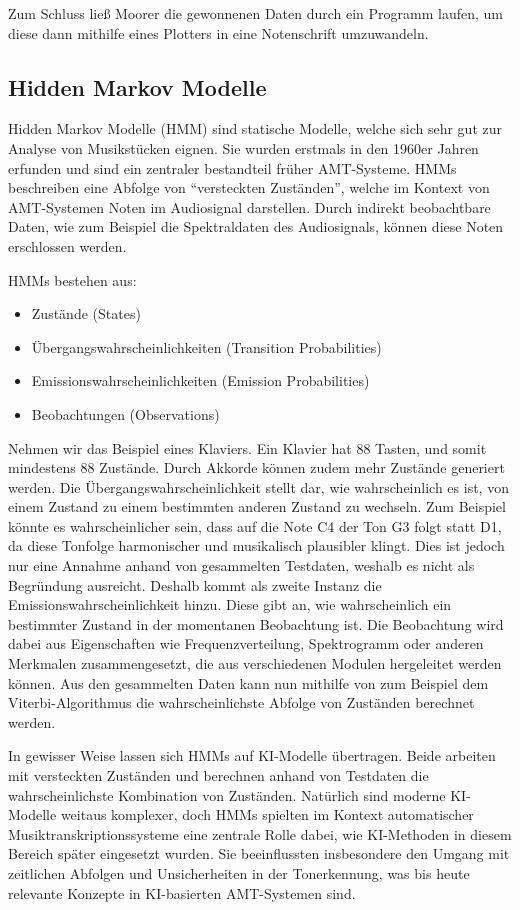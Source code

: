 Zum Schluss ließ Moorer die gewonnenen Daten durch ein Programm laufen, 
um diese dann mithilfe eines Plotters in eine Notenschrift umzuwandeln.

\subsection{Hidden Markov Modelle}\label{subsec:hiddenMarkov}
Hidden Markov Modelle (HMM) sind statische Modelle, welche sich sehr gut zur Analyse von Musikstücken eignen.
Sie wurden erstmals in den 1960er Jahren erfunden \cite{baum1970maximization} und
sind ein zentraler bestandteil früher AMT-Systeme.
HMMs beschreiben eine Abfolge von \enquote{versteckten Zuständen},
welche im Kontext von AMT-Systemen Noten im Audiosignal darstellen.
Durch indirekt beobachtbare Daten, wie zum Beispiel die Spektraldaten des Audiosignals,
können diese Noten erschlossen werden.

HMMs bestehen aus:
\begin{itemize}
    \item Zustände (States)
    \item Übergangswahrscheinlichkeiten (Transition Probabilities)
    \item Emissionswahrscheinlichkeiten (Emission Probabilities)
    \item Beobachtungen (Observations)
\end{itemize}
Nehmen wir das Beispiel eines Klaviers.
Ein Klavier hat 88 Tasten, und somit mindestens 88 Zustände.
Durch Akkorde können zudem mehr Zustände generiert werden.
Die Übergangswahrscheinlichkeit stellt dar,
wie wahrscheinlich es ist, von einem Zustand zu einem bestimmten anderen Zustand zu wechseln.
Zum Beispiel könnte es wahrscheinlicher sein, dass auf die Note C4 der Ton G3 folgt statt D1,
da diese Tonfolge harmonischer und musikalisch plausibler klingt.
Dies ist jedoch nur eine Annahme anhand von gesammelten Testdaten, weshalb es nicht als Begründung ausreicht.
Deshalb kommt als zweite Instanz die Emissionswahrscheinlichkeit hinzu.
Diese gibt an, wie wahrscheinlich ein bestimmter Zustand in der momentanen Beobachtung ist.
Die Beobachtung wird dabei aus Eigenschaften wie Frequenzverteilung,
Spektrogramm oder anderen Merkmalen zusammengesetzt, die aus verschiedenen Modulen hergeleitet werden können.
Aus den gesammelten Daten kann nun mithilfe von zum Beispiel dem Viterbi-Algorithmus \cite{takeda2002hidden} die
wahrscheinlichste Abfolge von Zuständen berechnet werden.

In gewisser Weise lassen sich HMMs auf KI-Modelle übertragen.
Beide arbeiten mit versteckten Zuständen und
berechnen anhand von Testdaten die wahrscheinlichste Kombination von Zuständen.
Natürlich sind moderne KI-Modelle weitaus komplexer,
doch HMMs spielten im Kontext automatischer Musiktranskriptionssysteme eine zentrale Rolle dabei,
wie KI-Methoden in diesem Bereich später eingesetzt wurden.
Sie beeinflussten insbesondere den Umgang mit zeitlichen Abfolgen
und Unsicherheiten in der Tonerkennung,
was bis heute relevante Konzepte in KI-basierten AMT-Systemen sind.

